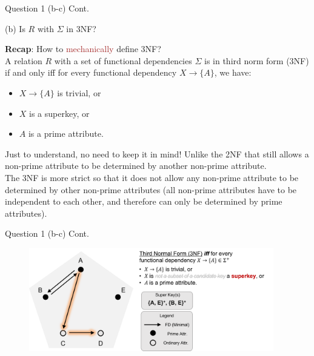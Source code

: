 \begin{frame}[fragile]{Question 1 (b-c) Cont.}

(b) Is $R$ with $\Sigma$ in 3NF?\\\vspace{10pt}

\textbf{Recap}: How to \textcolor{brown}{mechanically} define 3NF?\\\vspace{10pt}
A relation $R$ with a set of functional dependencies $\Sigma$ is in third norm form (3NF) if and only iff for every functional dependency $X\rightarrow\{A\}$, we have:
\begin{itemize}
	\item $X\rightarrow\{A\}$ is trivial, or
	\item $X$ is a superkey, or
	\item $A$ is a prime attribute.
\end{itemize}\vspace{5pt}

\begin{alertblock}{Just to understand, no need to keep it in mind!}
	Unlike the 2NF that still allows a non-prime attribute to be determined by another non-prime attribute.\\ 
	The 3NF is more strict so that it does not allow any non-prime attribute to be determined by other non-prime attributes (all non-prime attributes have to be independent to each other, and therefore can only be determined by prime attributes).
\end{alertblock}

\end{frame}

\begin{frame}[fragile]{Question 1 (b-c) Cont.}
\begin{figure}
	\includegraphics[width=0.95\textwidth, trim=0 0 0 0, clip]{t5/images/q3_3nf_highlight.png}
\end{figure}
\end{frame}

